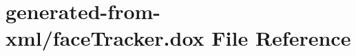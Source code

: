 \hypertarget{faceTracker_8dox}{}\section{generated-\/from-\/xml/face\+Tracker.dox File Reference}
\label{faceTracker_8dox}
